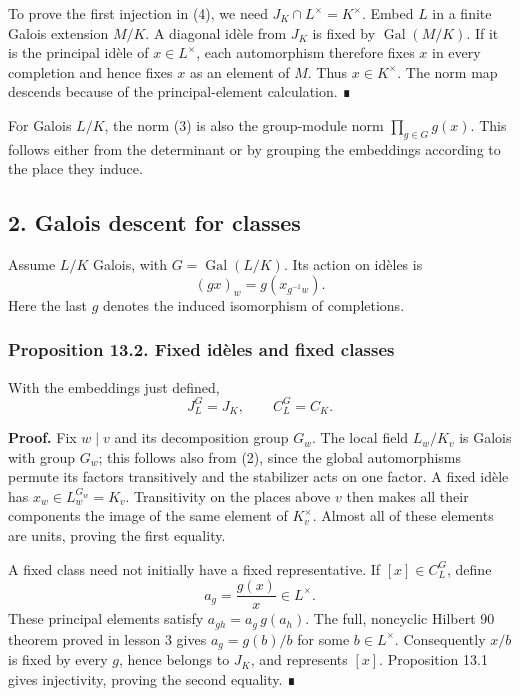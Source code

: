 \documentclass[11pt,a4paper]{article}
\begin{document}
To prove the first injection in (4), we need
\(J_K\cap L^\times=K^\times\). Embed \(L\) in a finite Galois extension
\(M/K\). A diagonal idèle from \(J_K\) is fixed by
\(\operatorname{Gal}(M/K)\). If it is the principal idèle of
\(x\in L^\times\), each automorphism therefore fixes \(x\) in every
completion and hence fixes \(x\) as an element of \(M\). Thus
\(x\in K^\times\). The norm map descends because of the
principal-element calculation. ∎

For Galois \(L/K\), the norm (3) is also the group-module norm
\(\prod_{g\in G}g(x)\). This follows either from the determinant or by
grouping the embeddings according to the place they induce.

\subsection{2. Galois descent for
classes}\label{galois-descent-for-classes}

Assume \(L/K\) Galois, with \(G=\operatorname{Gal}(L/K)\). Its action on
idèles is \[
(g x)_w=g(x_{g^{-1}w}).
\tag{5}
\] Here the last \(g\) denotes the induced isomorphism of completions.

\subsubsection{Proposition 13.2. Fixed idèles and fixed
classes}\label{proposition-13.2.-fixed-iduxe8les-and-fixed-classes}

With the embeddings just defined, \[
J_L^G=J_K,\qquad C_L^G=C_K.
\tag{6}
\]

\textbf{Proof.} Fix \(w\mid v\) and its decomposition group \(G_w\). The
local field \(L_w/K_v\) is Galois with group \(G_w\); this follows also
from (2), since the global automorphisms permute its factors
transitively and the stabilizer acts on one factor. A fixed idèle has
\(x_w\in L_w^{G_w}=K_v\). Transitivity on the places above \(v\) then
makes all their components the image of the same element of
\(K_v^\times\). Almost all of these elements are units, proving the
first equality.

A fixed class need not initially have a fixed representative. If
\([x]\in C_L^G\), define \[
a_g=\frac{g(x)}x\in L^\times.
\] These principal elements satisfy \(a_{gh}=a_g\,g(a_h)\). The full,
noncyclic Hilbert 90 theorem proved in lesson 3 gives \(a_g=g(b)/b\) for
some \(b\in L^\times\). Consequently \(x/b\) is fixed by every \(g\),
hence belongs to \(J_K\), and represents \([x]\). Proposition 13.1 gives
injectivity, proving the second equality. ∎
\end{document}
